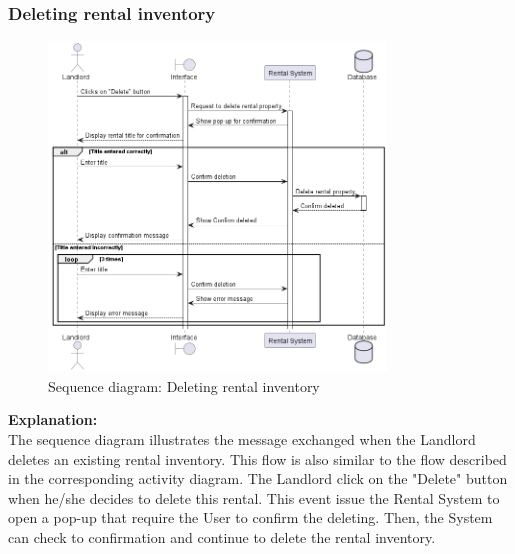 \subsubsection{Deleting rental inventory}
\begin{figure}[H]
    \centering
    \includegraphics[width=0.8\textwidth]{Images/Sequence/seq_diag_delete_rental_inventory.png}
    \caption{Sequence diagram: Deleting rental inventory}
    \label{fig:enter-label}
\end{figure}
\noindent \textbf{Explanation:}\\
The sequence diagram illustrates the message exchanged when the Landlord deletes an existing rental inventory. This flow is also similar to the flow described in the corresponding activity diagram. The Landlord click on the "Delete" button when he/she decides to delete this rental. This event issue the Rental System to open a pop-up that require the User to confirm the deleting. Then, the System can check to confirmation and continue to delete the rental inventory.